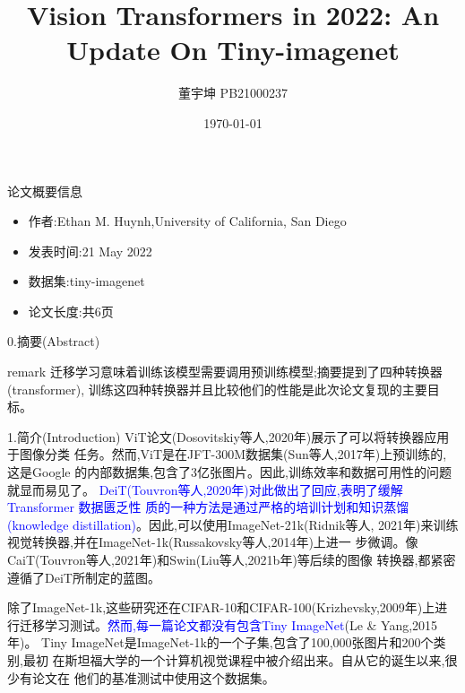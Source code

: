 \documentclass[UTF8]{ctexbeamer}
\title[论文复现报告]{Vision Transformers in 2022:
An Update On Tiny-imagenet}
\author[董宇坤]{董宇坤 PB21000237}
\institute[ustc]{dyk2021@mail.ustc.edu.cn}
\date[\today]{\today}
\begin{document}
\begin{frame}
    \titlepage
\end{frame}

\begin{frame}{论文概要信息}
  \begin{itemize}
    \item 作者:Ethan M. Huynh,University of California, San Diego
    \item 发表时间:21 May 2022
    \item 数据集:tiny-imagenet
    \item 论文长度:共6页
  \end{itemize}
\end{frame}

\begin{frame}{0.摘要(Abstract)}
  \begin{block}{remark}
    迁移学习意味着训练该模型需要调用预训练模型;摘要提到了四种转换器(transformer),
    训练这四种转换器并且比较他们的性能是此次论文复现的主要目标。
  \end{block}
\end{frame}

\begin{frame}{1.简介(Introduction)}
  \kaishu ViT论文(Dosovitskiy等人,2020年)展示了可以将转换器应用于图像分类
  任务。然而,ViT是在JFT-300M数据集(Sun等人,2017年)上预训练的,这是Google
  的内部数据集,包含了3亿张图片。因此,训练效率和数据可用性的问题就显而易见了。
  \textcolor{blue}{DeiT(Touvron等人,2020年)对此做出了回应,表明了缓解 Transformer 数据匮乏性
  质的一种方法是通过严格的培训计划和知识蒸馏(knowledge distillation)}。因此,可以使用ImageNet-21k(Ridnik等人,
  2021年)来训练视觉转换器,并在ImageNet-1k(Russakovsky等人,2014年)上进一
  步微调。像CaiT(Touvron等人,2021年)和Swin(Liu等人,2021b年)等后续的图像
  转换器,都紧密遵循了DeiT所制定的蓝图。

  除了ImageNet-1k,这些研究还在CIFAR-10和CIFAR-100(Krizhevsky,2009年)上进
  行迁移学习测试。\textcolor{blue}{然而,每一篇论文都没有包含Tiny ImageNet}(Le \& Yang,2015年)。
  Tiny ImageNet是ImageNet-1k的一个子集,包含了100,000张图片和200个类别,最初
  在斯坦福大学的一个计算机视觉课程中被介绍出来。自从它的诞生以来,很少有论文在
  他们的基准测试中使用这个数据集。
\end{frame}
\end{document}
